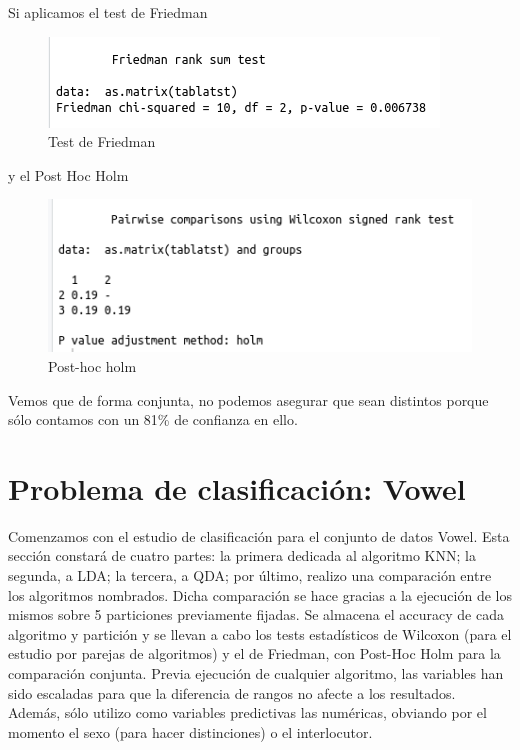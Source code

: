 Si aplicamos el test de Friedman

\begin{figure}[H] %
	\centering
	\includegraphics[scale=0.6]{friedman3.png}  %
	\caption{Test de Friedman} 
	\label{fig:friedman3}
\end{figure}

y el Post Hoc Holm 

\begin{figure}[H] %
	\centering
	\includegraphics[scale=0.6]{ph3.png}  %
	\caption{Post-hoc holm} 
	\label{fig:ph3}
\end{figure}

Vemos que de forma conjunta, no podemos asegurar que sean distintos porque sólo contamos con un 81\% de confianza en ello.
\newpage


\section{Problema de clasificación: Vowel}

Comenzamos con el estudio de clasificación para el conjunto de datos Vowel. Esta sección constará de cuatro partes: la primera dedicada al algoritmo KNN; la segunda, a LDA; la tercera, a QDA; por último, realizo una comparación entre los algoritmos nombrados. Dicha comparación se hace gracias a la ejecución de los mismos sobre 5 particiones previamente fijadas. Se almacena el accuracy de cada algoritmo y partición y se llevan a cabo los tests estadísticos de Wilcoxon (para el estudio por parejas de algoritmos) y el de Friedman, con Post-Hoc Holm para la comparación conjunta. Previa ejecución de cualquier algoritmo, las variables han sido escaladas para que la diferencia de rangos no afecte a los resultados. Además, sólo utilizo como variables predictivas las numéricas, obviando por el momento el sexo (para hacer distinciones) o el interlocutor.

